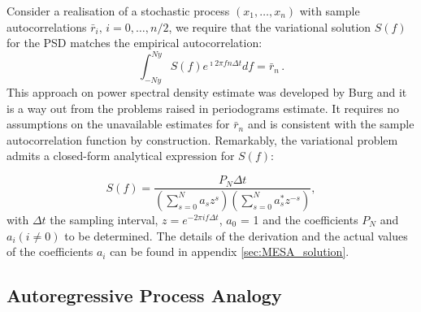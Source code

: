 \documentclass[twocolumn,showpacs,preprintnumbers,nofootinbib,prd,
superscriptaddress,10pt]{revtex4-1}
\begin{document}
Consider a realisation of a stochastic process $(x_1,\ldots,x_n)$ with sample autocorrelations $\bar r_i,\,i=0,\ldots, n/2$, we require that the variational solution $S(f)$ for the PSD matches the empirical autocorrelation:
\begin{equation}\label{eq:MaxConstraint}
\int_{-Ny}^{Ny} S(f) e^{\imath 2 \pi f n \Delta t} df = \bar r_{n}\,.
\end{equation}
This approach on power spectral density estimate was developed by Burg \cite{burg1975maximum} and it is a way out from the problems raised in periodograms estimate. It requires no assumptions on the unavailable estimates for $\bar r_n$ and is consistent with the sample autocorrelation function by construction. Remarkably, the variational problem admits a closed-form analytical expression for $S(f)$:

\begin{equation}\label{eq:MESApsd}
    S(f) = \frac{P_N \Delta t}{\left(\sum_{s=0}^N a_s z^s\right)\left(\sum_{s = 0}^N a^*_s z^{-s}\right)}, 
\end{equation}
with $\Delta t$ the sampling interval, $z=e^{-2\pi i f \Delta t}$, $a_0$ = 1 and the coefficients $P_N$ and $a_i (i \neq 0)$ to be determined. The details of the derivation and the actual values of the coefficients $a_i$ can be found in appendix \ref{sec:MESA_solution}.

\subsection{Autoregressive Process Analogy} \label{sec:autoregr}
\end{document}

